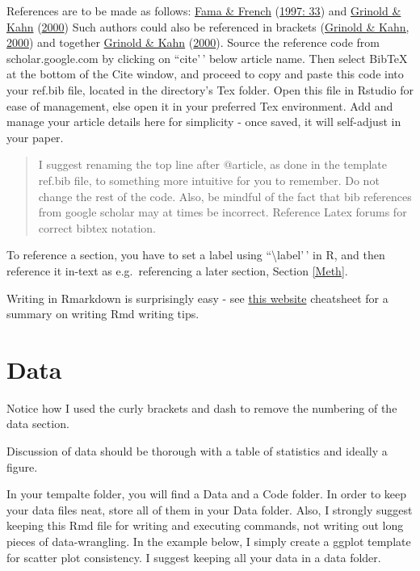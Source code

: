 \documentclass[11pt,preprint, authoryear]{elsarticle}
\numberwithin{equation}{section}
\numberwithin{figure}{section}
\numberwithin{table}{section}
\begin{document}
References are to be made as follows:
\protect\hyperlink{ref-fama1997}{Fama \& French}
(\protect\hyperlink{ref-fama1997}{1997: 33}) and
\protect\hyperlink{ref-grinold2000}{Grinold \& Kahn}
(\protect\hyperlink{ref-grinold2000}{2000}) Such authors could also be
referenced in brackets (\protect\hyperlink{ref-grinold2000}{Grinold \&
Kahn, 2000}) and together \protect\hyperlink{ref-grinold2000}{Grinold \&
Kahn} (\protect\hyperlink{ref-grinold2000}{2000}). Source the reference
code from scholar.google.com by clicking on ``cite'\,' below article
name. Then select BibTeX at the bottom of the Cite window, and proceed
to copy and paste this code into your ref.bib file, located in the
directory's Tex folder. Open this file in Rstudio for ease of
management, else open it in your preferred Tex environment. Add and
manage your article details here for simplicity - once saved, it will
self-adjust in your paper.

\begin{quote}
I suggest renaming the top line after @article, as done in the template
ref.bib file, to something more intuitive for you to remember. Do not
change the rest of the code. Also, be mindful of the fact that bib
references from google scholar may at times be incorrect. Reference
Latex forums for correct bibtex notation.
\end{quote}

To reference a section, you have to set a label using
``\textbackslash label'\,' in R, and then reference it in-text as
e.g.~referencing a later section, Section \ref{Meth}.

Writing in Rmarkdown is surprisingly easy - see
\href{https://www.rstudio.com/wp-content/uploads/2015/03/rmarkdown-reference.pdf}{this
website} cheatsheet for a summary on writing Rmd writing tips.

\hypertarget{data}{%
\section*{Data}\label{data}}

Notice how I used the curly brackets and dash to remove the numbering of
the data section.

Discussion of data should be thorough with a table of statistics and
ideally a figure.

In your tempalte folder, you will find a Data and a Code folder. In
order to keep your data files neat, store all of them in your Data
folder. Also, I strongly suggest keeping this Rmd file for writing and
executing commands, not writing out long pieces of data-wrangling. In
the example below, I simply create a ggplot template for scatter plot
consistency. I suggest keeping all your data in a data folder.
\end{document}
